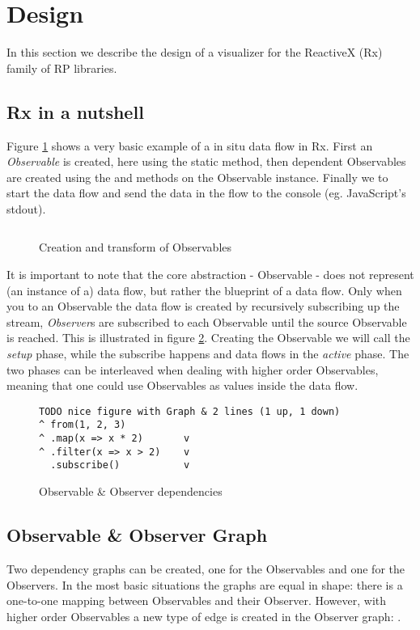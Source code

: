 \section{Design}
In this section we describe the design of a visualizer for the ReactiveX (Rx) family of RP libraries. 

\subsection{Rx in a nutshell}
Figure \ref{sample1} shows a very basic example of a in situ data flow in Rx. First an \textit{Observable} is created, here using the static  method, then dependent Observables are created using the  and  methods on the Observable instance. Finally we  to start the data flow and send the data in the flow to the console (eg. JavaScript's stdout).

\begin{figure}
\inputminted[tabsize=2]{javascript}{listings/sample1.js}	
\caption{Creation and transform of Observables}
\label{sample1}
\end{figure}

It is important to note that the core abstraction - Observable - does not represent (an instance of a) data flow, but rather the blueprint of a data flow. Only when you  to an Observable the data flow is created by recursively subscribing up the stream, \textit{Observer}s are subscribed to each Observable until the source Observable is reached.
 This is illustrated in figure \ref{dualgraphs}. Creating the Observable we will call the \textit{setup} phase, while the subscribe happens and data flows in the \textit{active} phase. The two phases can be interleaved when dealing with higher order Observables, meaning that one could use Observables as values inside the data flow.

\begin{figure}
\begin{verbatim}
TODO nice figure with Graph & 2 lines (1 up, 1 down)
^ from(1, 2, 3)   			
^ .map(x => x * 2)       v
^ .filter(x => x > 2)    v
  .subscribe()           v
\end{verbatim}
\caption{Observable \& Observer dependencies}
\label{dualgraphs}
\end{figure}

\subsection{Observable \& Observer Graph}
Two dependency graphs can be created, one for the Observables and one for the Observers. In the most basic situations the graphs are equal in shape: there is a one-to-one mapping between Observables and their Observer. However, with higher order Observables a new type of edge is created in the Observer graph: .

